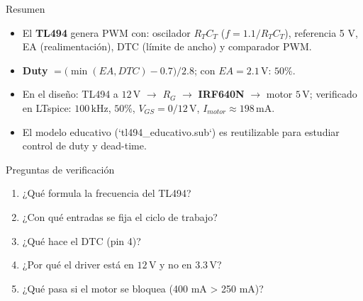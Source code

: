 \documentclass[aspectratio=169]{beamer}
\begin{document}
\begin{frame}{Resumen}
  \begin{itemize}
    \item El \textbf{TL494} genera PWM con: oscilador $R_TC_T$ ($f=1.1/R_TC_T$),
      referencia 5 V, EA (realimentación), DTC (límite de ancho) y comparador PWM.
    \item \textbf{Duty} $= \big(\min(EA,DTC)-0.7\big)/2.8$; con $EA=2.1\,\mathrm{V}$:
      $50\%$.
    \item En el diseño: TL494 a $12\,\mathrm{V}$ $\to$ $R_G$ $\to$ \textbf{IRF640N}
      $\to$ motor $5\,\mathrm{V}$; verificado en LTspice: $100\,\mathrm{kHz}$, $50\%$,
      $V_{GS}=0/12\,\mathrm{V}$, $I_{motor}\approx 198\,\mathrm{mA}$.
    \item El modelo educativo (`tl494\_educativo.sub`) es reutilizable para
      estudiar control de duty y dead-time.
  \end{itemize}
\end{frame}

\begin{frame}{Preguntas de verificación}
  \begin{enumerate}
    \item ¿Qué formula la frecuencia del TL494?
    \item ¿Con qué entradas se fija el ciclo de trabajo?
    \item ¿Qué hace el DTC (pin 4)?
    \item ¿Por qué el driver está en $12\,\mathrm{V}$ y no en $3.3\,\mathrm{V}$?
    \item ¿Qué pasa si el motor se bloquea (400 mA > 250 mA)?
  \end{enumerate}
\end{frame}
\end{document}
